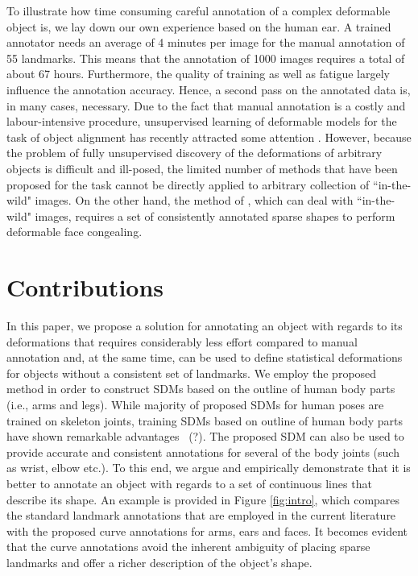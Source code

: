 To illustrate how time consuming careful annotation of a complex deformable object is, we lay down our own experience based on the human ear. A trained annotator needs an average of 4 minutes per image for the manual annotation of 55 landmarks. This means that the annotation of 1000 images requires a total of about 67 hours. Furthermore, the quality of training as well as fatigue largely influence the annotation accuracy. Hence, a second pass on the annotated data is, in many cases, necessary. Due to the fact that manual annotation is a costly and labour-intensive procedure, unsupervised learning of deformable models for the task of object alignment has recently attracted some attention \cite{frey2003learning, baker2004automatic, cootes2004groupwise, jojic2006escaping, Huang2006, kokkinos2007unsupervised, jiang2009learning, liu2009simultaneous, Zhang2012}. However, because the problem of fully unsupervised discovery of the deformations of arbitrary objects is difficult and ill-posed, the limited number of methods that have been proposed for the task cannot be directly applied to arbitrary collection of ``in-the-wild" images. On the other hand, the method of \cite{antonakos2014automatic}, which can deal with ``in-the-wild" images, requires a set of consistently annotated sparse shapes to perform deformable face congealing.


\section{Contributions}

In this paper, we propose a solution for annotating an object with regards to its deformations that requires considerably less effort compared to manual annotation and, at the same time, can be used to define statistical deformations for objects without a consistent set of landmarks. We employ the proposed method in order to construct SDMs based on the outline of human body parts (i.e., arms and legs). While majority of proposed SDMs for human poses are trained on skeleton joints, training SDMs based on outline of human body parts have shown remarkable advantages~\cite{zuffi2012pictorial} (?). The proposed SDM can also be used to provide accurate and consistent annotations for several of the body joints (such as wrist, elbow etc.).
To this end, we argue and empirically demonstrate that it is better to annotate an object with regards to a set of continuous lines that describe its shape. An example is provided in Figure \ref{fig:intro}, which compares the standard landmark annotations that are employed in the current literature with the proposed curve annotations for arms, ears and faces. It becomes evident that the curve annotations avoid the inherent ambiguity of placing sparse landmarks and offer a richer description of the object's shape.

